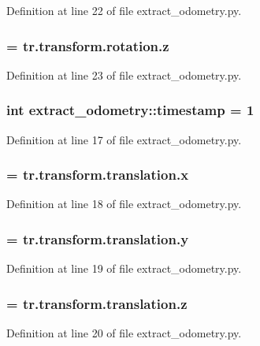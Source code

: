 \-Definition at line 22 of file extract\-\_\-odometry.\-py.

\subsubsection[{qz}]{ = tr.\-transform.\-rotation.\-z}\label{namespaceextract__odometry_afdfcf316dea70584681108801ecedbd4}


\-Definition at line 23 of file extract\-\_\-odometry.\-py.

\subsubsection[{timestamp}]{\setlength{\rightskip}{0pt plus 5cm}int {\bf extract\-\_\-odometry\-::timestamp} = 1}\label{namespaceextract__odometry_a5da04395665e01a36af306be9db5a24a}


\-Definition at line 17 of file extract\-\_\-odometry.\-py.

\subsubsection[{tx}]{ = tr.\-transform.\-translation.\-x}\label{namespaceextract__odometry_a05d2c5d0e1c739be1595add533b67227}


\-Definition at line 18 of file extract\-\_\-odometry.\-py.

\subsubsection[{ty}]{ = tr.\-transform.\-translation.\-y}\label{namespaceextract__odometry_a1a935d56c6f271d542d12ebd774ec073}


\-Definition at line 19 of file extract\-\_\-odometry.\-py.

\subsubsection[{tz}]{ = tr.\-transform.\-translation.\-z}\label{namespaceextract__odometry_a05243f66936d0d11cc5351018bfb1f2e}


\-Definition at line 20 of file extract\-\_\-odometry.\-py.

